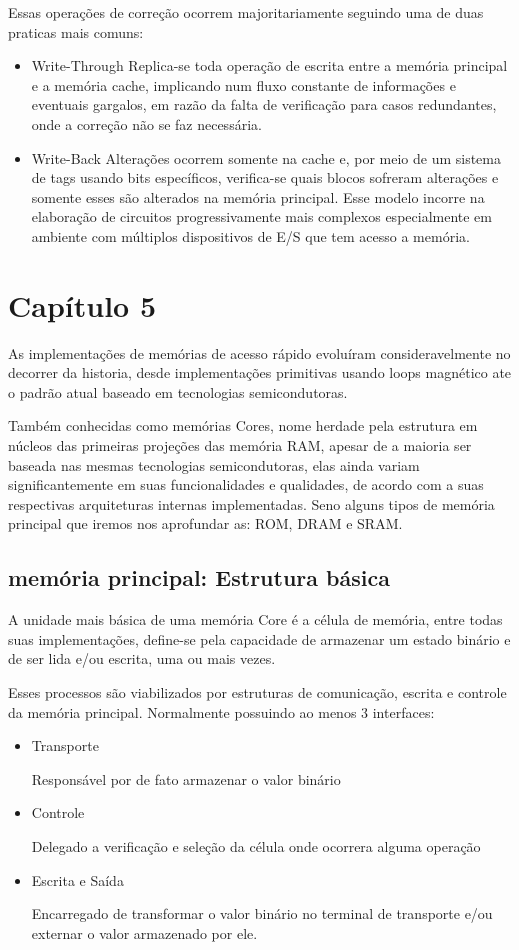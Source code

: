\documentclass[12pt]{article}
\begin{document}
Essas operações de correção ocorrem majoritariamente seguindo uma de duas praticas mais comuns:
\begin{itemize}
\item Write-Through
Replica-se toda operação de escrita entre a memória principal e a memória cache, implicando num fluxo constante de informações e eventuais gargalos, em razão da falta de verificação para casos redundantes, onde a correção não se faz necessária.

\item Write-Back
Alterações ocorrem somente na cache e, por meio de um sistema de tags usando bits específicos, verifica-se quais blocos sofreram alterações e somente esses são alterados na memória principal. Esse modelo incorre na elaboração de circuitos progressivamente mais complexos especialmente em ambiente com múltiplos dispositivos de E/S que tem acesso a memória.
\end{itemize}

\section{Capítulo 5}
As implementações de memórias de acesso rápido evoluíram consideravelmente no decorrer da historia, desde implementações primitivas usando loops magnético ate o padrão atual baseado em tecnologias semicondutoras. 

Também conhecidas como memórias Cores, nome herdade pela estrutura em núcleos das primeiras projeções das memória RAM, apesar de a maioria ser baseada nas mesmas tecnologias semicondutoras, elas ainda variam significantemente em suas funcionalidades e qualidades, de acordo com a suas respectivas arquiteturas internas implementadas. Seno alguns tipos de memória principal que iremos nos aprofundar as: ROM, DRAM e SRAM.

\subsection{memória principal: Estrutura básica}
A unidade mais básica de uma memória Core é a célula de memória, entre todas suas implementações, define-se pela capacidade de armazenar um estado binário e de ser lida e/ou escrita, uma ou mais vezes.

Esses processos são viabilizados por estruturas de comunicação, escrita e controle da memória principal. Normalmente possuindo ao menos 3 interfaces:

\begin{itemize}
 \item Transporte

 Responsável por de fato armazenar o valor binário
\item Controle

Delegado a verificação e seleção da célula onde ocorrera alguma operação
\item Escrita e Saída

Encarregado de transformar o valor binário no terminal de transporte e/ou externar o valor armazenado por ele.
\end{itemize} 
\end{document}
